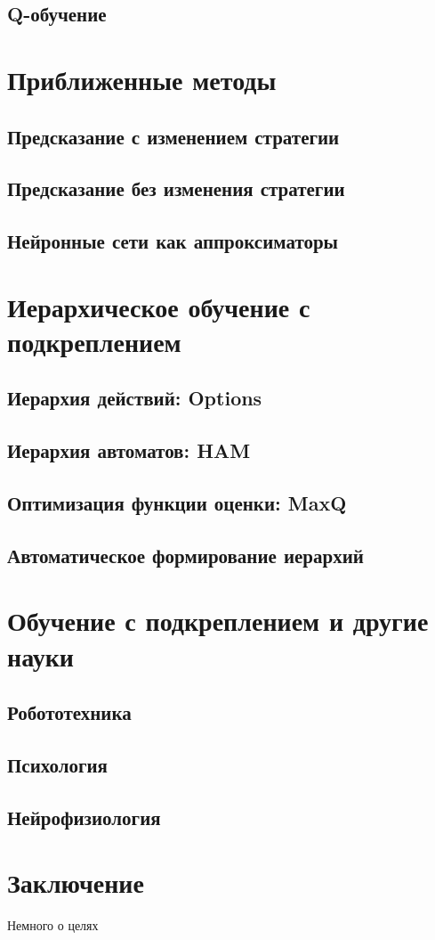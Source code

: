 \documentclass[11pt]{memoir}
\begin{document}
	\section{Q-обучение}
	
	\chapter{Приближенные методы}
	\section{Предсказание с изменением стратегии}
	
	\section{Предсказание без изменения стратегии}
	
	\section{Нейронные сети как аппроксиматоры}
	
	\chapter{Иерархическое обучение с подкреплением}
	\section{Иерархия действий: Options}
	
	\section{Иерархия автоматов: HAM}
	
	\section{Оптимизация функции оценки: MaxQ}
	
	\section{Автоматическое формирование иерархий}
	
	\chapter{Обучение с подкреплением и другие науки}

	\section{Робототехника}
		
	\section{Психология}
	
	\section{Нейрофизиология}
	

	\chapter*{Заключение}
	Немного о целях
	\printbibliography
\end{document}
